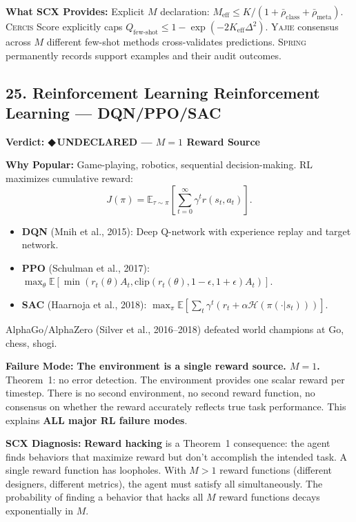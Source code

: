 \documentclass[12pt,a4paper]{article}
\theoremstyle{definition}
\newcommand{\guilty}{{\color{guiltycolor}\textbf{◆\,UNDECLARED}}}
\newcommand{\Yajie}{\textsc{Yajie}}
\newcommand{\Spring}{\textsc{Spring}}
\newcommand{\Cercis}{\textsc{Cercis}}
\newcommand{\E}{\mathbb{E}}
\newcommand{\cH}{\mathcal{H}}
\newcommand{\auditHeader}[1]{\medskip\noindent\textbf{\large #1}\medskip}
\newcommand{\whyPopular}{\noindent\textbf{Why Popular:} }
\newcommand{\whyFail}{\noindent\textbf{Failure Mode:} }
\newcommand{\whatMissing}{\noindent\textbf{What SCX Provides:} }
\newcommand{\diagnosis}{\noindent\textbf{SCX Diagnosis:} }
\begin{document}
\whatMissing{} Explicit $M$ declaration: $M_{\text{eff}} \le K/(1 + \bar{\rho}_{\text{class}} + \bar{\rho}_{\text{meta}})$. \Cercis{} Score explicitly caps $Q_{\text{few-shot}} \le 1 - \exp(-2K_{\text{eff}}\Delta^2)$. \Yajie{} consensus across $M$ different few-shot methods cross-validates predictions. \Spring{} permanently records support examples and their audit outcomes.

\subsection{25. Reinforcement Learning Reinforcement Learning --- DQN/PPO/SAC}

\auditHeader{Verdict: \guilty{} — $M=1$ Reward Source}

\whyPopular{} Game-playing, robotics, sequential decision-making. RL maximizes cumulative reward:
\[
J(\pi) = \E_{\tau \sim \pi}\left[\sum_{t=0}^\infty \gamma^t r(s_t, a_t)\right].
\]
\begin{itemize}[nosep]
    \item \textbf{DQN} (Mnih et al., 2015): Deep Q-network with experience replay and target network.
    \item \textbf{PPO} (Schulman et al., 2017): $\max_\theta \E[\min(r_t(\theta)A_t, \text{clip}(r_t(\theta), 1-\epsilon, 1+\epsilon)A_t)]$.
    \item \textbf{SAC} (Haarnoja et al., 2018): $\max_\pi \E[\sum_t \gamma^t(r_t + \alpha \cH(\pi(\cdot|s_t)))]$.
\end{itemize}
AlphaGo/AlphaZero (Silver et al., 2016--2018) defeated world champions at Go, chess, shogi.

\whyFail{} \textbf{The environment is a single reward source. $M=1$.} Theorem~1: no error detection. The environment provides one scalar reward per timestep. There is no second environment, no second reward function, no consensus on whether the reward accurately reflects true task performance. This explains \textbf{ALL major RL failure modes}.

\diagnosis{} \textbf{Reward hacking} is a Theorem~1 consequence: the agent finds behaviors that maximize reward but don't accomplish the intended task. A single reward function has loopholes. With $M>1$ reward functions (different designers, different metrics), the agent must satisfy all simultaneously. The probability of finding a behavior that hacks all $M$ reward functions decays exponentially in $M$.
\end{document}
